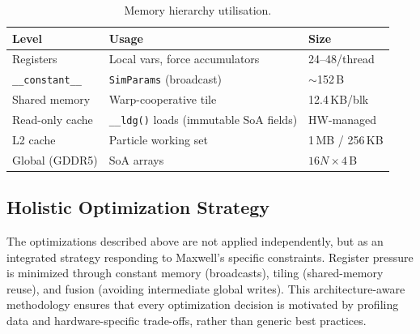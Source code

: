 \begin{table}[H]
  \caption{Memory hierarchy utilisation.}
  \label{tab:mem_hierarchy}
  \centering
  \scriptsize
  \begin{tabular}{@{}lll@{}}
    \toprule
    \textbf{Level} & \textbf{Usage} & \textbf{Size} \\
    \midrule
    Registers        & Local vars, force accumulators & 24--48/thread \\
    \texttt{\_\_constant\_\_} & \texttt{SimParams} (broadcast) & $\sim$152\,B \\
    Shared memory    & Warp-cooperative tile          & 12.4\,KB/blk \\
    Read-only cache  & \texttt{\_\_ldg()} loads (immutable SoA fields)        & HW-managed \\
    L2 cache         & Particle working set           & 1\,MB / 256\,KB \\
    Global (GDDR5)   & SoA arrays                     & $16N \times 4$\,B \\
    \bottomrule
  \end{tabular}
\end{table}

\subsection{Holistic Optimization Strategy}
\label{sec:holistic}

The optimizations described above are not applied independently, but as an
integrated strategy responding to Maxwell's specific constraints. Register
pressure is minimized through constant memory (broadcasts), tiling (shared-memory
reuse), and fusion (avoiding intermediate global writes). This architecture-aware
methodology ensures that every optimization decision is motivated by profiling data
and hardware-specific trade-offs, rather than generic best practices.

